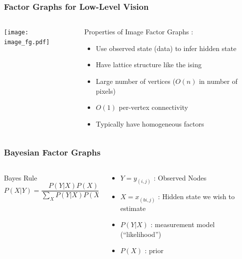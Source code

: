 \documentclass[compress]{beamer}
\begin{document}
\begin{frame} 
  \frametitle{Factor Graphs for Low-Level Vision}
  \begin{columns}
    \begin{column}{5cm}
      \texttt{[image: image\_fg.pdf]}
    \end{column}
    \begin{column}{5cm}
      Properties of Image Factor Graphs \cite{Freeman_Markov_1999}: 
      \begin{itemize}
      \item Use observed state (data) to infer hidden state
      \item Have lattice structure like the ising
      \item Large number of vertices ($O(n)$ in number of pixels)
      \item $O(1)$ per-vertex connectivity
      \item Typically have homogeneous factors
      \end{itemize}
    \end{column}
  \end{columns}
\end{frame}

\begin{frame}
\frametitle{Bayesian Factor Graphs}
\begin {columns}
  \begin{column}{5cm}
    \begin{block}{Bayes Rule} 
      \begin{equation*}
        P(X | Y ) = \frac{P(Y | X) P(X)}{\sum_XP(Y|X)P(X)}
      \end{equation*}
    \end{block}
  \end{column}
  \begin{column}{5cm}
    \begin{itemize}
    \item $Y = {y_{(i, j)}}$ : Observed Nodes
    \item $X = {x_{(bi, j)}}$ : Hidden state we wish to estimate
    \item $P(Y | X) $ : measurement model (``likelihood'')
    \item $P(X) $ : prior 

    \end{itemize}
  \end{column}
  
  \end{columns}
\end{frame}
\end{document}
